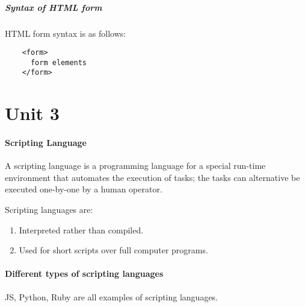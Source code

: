 \documentclass[a4paper]{article}
\begin{document}
    \subsubsection{Syntax of HTML form}
    HTML form syntax is as follows:
    \begin{lstlisting}
    <form>
      form elements
    </form>
    \end{lstlisting}




\pagebreak

\part{Unit 3}%
  \subsection{Scripting Language} %
  A scripting language is a programming language for a special run-time
  environment that automates the execution of tasks; the tasks can 
  alternative be executed one-by-one by a human operator.

  Scripting languages are:
  \begin{enumerate}
    \item Interpreted rather than compiled.
    \item Used for short scripts over full computer programs.
  \end{enumerate}%

  \subsection{Different types of scripting languages}%
  JS, Python, Ruby are all examples of scripting languages.%
\end{document}
